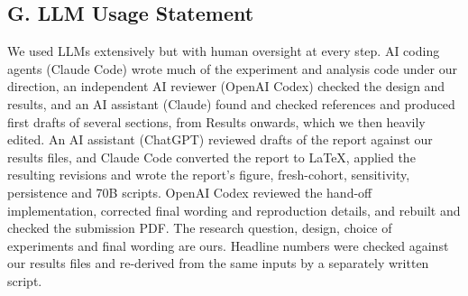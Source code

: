 \documentclass[11pt,letterpaper]{article}
\begin{document}
\subsection{G. LLM Usage Statement}

We used LLMs extensively but with human oversight at every step.
AI coding agents (Claude Code) wrote much of the experiment and analysis code under our direction, an independent AI reviewer (OpenAI Codex) checked the design and results, and an AI assistant (Claude) found and checked references and produced first drafts of several sections, from Results onwards, which we then heavily edited.
An AI assistant (ChatGPT) reviewed drafts of the report against our results files, and Claude Code converted the report to LaTeX, applied the resulting revisions and wrote the report's figure, fresh-cohort, sensitivity, persistence and 70B scripts. OpenAI Codex reviewed the hand-off implementation, corrected final wording and reproduction details, and rebuilt and checked the submission PDF.
The research question, design, choice of experiments and final wording are ours.
Headline numbers were checked against our results files and re-derived from the same inputs by a separately written script.
\end{document}
